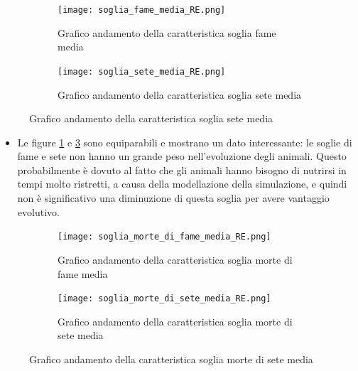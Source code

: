 \documentclass[11pt]{article}
\begin{document}
\newpage

\begin{figure}[h!]
	\hspace{-5mm}
	\begin{subfigure}{.52\textwidth}
         \centering
         \texttt{[image: soglia\_fame\_media\_RE.png]}
         \caption{Grafico andamento della caratteristica soglia fame media}
         \label{fig:FameRE}
	\end{subfigure}
	\begin{subfigure}{.55\textwidth}
		\hspace{12mm}
		\centering
        \texttt{[image: soglia\_sete\_media\_RE.png]}
        \caption{Grafico andamento della caratteristica soglia sete media}
        \label{fig:SeteRE}
	\end{subfigure}
\end{figure}

\begin{itemize}


    \item Le figure \ref{fig:FameRE} e \ref{fig:SeteRE} sono equiparabili e mostrano un dato interessante: le soglie di fame e sete non hanno un grande peso nell'evoluzione degli animali. Questo probabilmente è dovuto al fatto che gli animali hanno bisogno di nutrirsi in tempi molto ristretti, a causa della modellazione della simulazione, e quindi non è significativo una diminuzione di questa soglia per avere vantaggio evolutivo.
\end{itemize}

\newpage 

\begin{figure}[ht!]
	\hspace{-5mm}
	\begin{subfigure}{.52\textwidth}
         \centering
         \texttt{[image: soglia\_morte\_di\_fame\_media\_RE.png]}
         \caption{Grafico andamento della caratteristica soglia morte di fame media}
         \label{fig:morteFameRE}
	\end{subfigure}
	\begin{subfigure}{.55\textwidth}
		\hspace{12mm}
		\centering
        \texttt{[image: soglia\_morte\_di\_sete\_media\_RE.png]}
        \caption{Grafico andamento della caratteristica soglia morte di sete media}
        \label{fig:morteSeteRE}
	\end{subfigure}
\end{figure}
\end{document}

